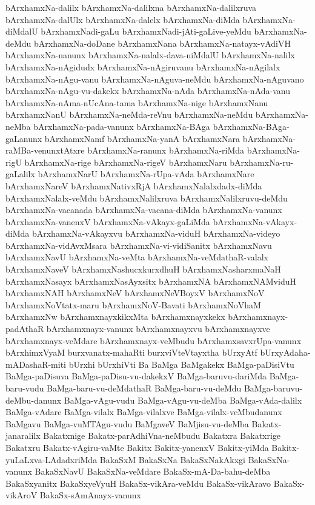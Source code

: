{bArxhamxNa-dalilx
bArxhamxNa-dalilxna
bArxhamxNa-dalilxruva
bArxhamxNa-dalUlx
bArxhamxNa-dalelx
bArxhamxNa-diMda
bArxhamxNa-diMdalU
bArxhamxNadi-gaLu
bArxhamxNadi-jAti-gaLive-yeMdu
bArxhamxNa-deMdu
bArxhamxNa-doDane
bArxhamxNana
bArxhamxNa-natayx-vAdiVH
bArxhamxNa-nanunx
bArxhamxNa-nalalx-dava-niMdalU
bArxhamxNa-nalilx
bArxhamxNa-nAgidudx
bArxhamxNa-nAgiruvanu
bArxhamxNa-nAgilalx
bArxhamxNa-nAgu-vanu
bArxhamxNa-nAguva-neMdu
bArxhamxNa-nAguvano
bArxhamxNa-nAgu-vu-dakekx
bArxhamxNa-nAda
bArxhamxNa-nAda-vanu
bArxhamxNa-nAma-nUcAna-tama
bArxhamxNa-nige
bArxhamxNanu
bArxhamxNanU
bArxhamxNa-neMda-reVnu
bArxhamxNa-neMdu
bArxhamxNa-neMba
bArxhamxNa-pada-vanunx
bArxhamxNa-BAga
bArxhamxNa-BAga-gaLanunx
bArxhamxNamf
bArxhamxNa-yanA
bArxhamxNara
bArxhamxNa-raMBa-venunxtAtxre
bArxhamxNa-ranunx
bArxhamxNa-riMda
bArxhamxNa-rigU
bArxhamxNa-rige
bArxhamxNa-rigeV
bArxhamxNaru
bArxhamxNa-ru-gaLalilx
bArxhamxNarU
bArxhamxNa-rUpa-vAda
bArxhamxNare
bArxhamxNareV
bArxhamxNativxRjA
bArxhamxNalalxdadx-diMda
bArxhamxNalalx-veMdu
bArxhamxNalilxruva
bArxhamxNalilxruvu-deMdu
bArxhamxNa-vacanada
bArxhamxNa-vacana-diMda
bArxhamxNa-vanunx
bArxhamxNa-vanenxV
bArxhamxNa-vAkayx-gaLiMda
bArxhamxNa-vAkayx-diMda
bArxhamxNa-vAkayxvu
bArxhamxNa-viduH
bArxhamxNa-videyo
bArxhamxNa-vidAvxMsara
bArxhamxNa-vi-vidiSanitx
bArxhamxNavu
bArxhamxNavU
bArxhamxNa-veMta
bArxhamxNa-veMdathaR-valalx
bArxhamxNaveV
bArxhamxNashucxkurxdhuH
bArxhamxNasharxmaNaH
bArxhamxNasayx
bArxhamxNasAyxsitx
bArxhamxNA
bArxhamxNAMviduH
bArxhamxNAH
bArxhamxNeV
bArxhamxNeVBoyxV
bArxhamxNoV
bArxhamxNoVtatx-maru
bArxhamxNoV-Bavati
bArxhamxNoVhaM
bArxhamxNw
bArxhamxnayxkikxMta
bArxhamxnayxkekx
bArxhamxnayx-padAthaR
bArxhamxnayx-vanunx
bArxhamxnayxvu
bArxhamxnayxve
bArxhamxnayx-veMdare
bArxhamxnayx-veMbudu
bArxhamxsavxrUpa-vanunx
bArxhimxVyaM
burxvanatx-mahaRti
burxviVteVtayxtha
bUrxyAtf
bUrxyAdaha-mADashaR-miti
bUrxhi
bUrxhiVti
Ba
BaMga
BaMgakekx
BaMga-paDisiVtu
BaMga-paDisuva
BaMga-paDisu-vu-dakekxV
BaMga-baruvu-dariMda
BaMga-baru-vudu
BaMga-baru-vu-deMdathaR
BaMga-baru-vu-deMdu
BaMga-baruvu-deMbu-danunx
BaMga-vAgu-vudu
BaMga-vAgu-vu-deMba
BaMga-vAda-dalilx
BaMga-vAdare
BaMga-vilalx
BaMga-vilalxve
BaMga-vilalx-veMbudanunx
BaMgavu
BaMga-vuMTAgu-vudu
BaMgaveV
BaMjisu-vu-deMba
Bakatx-janaralilx
Bakatxnige
Bakatx-parAdhiVna-neMbudu
Bakatxra
Bakatxrige
Bakatxru
Bakatx-vAgiru-vaMte
Bakitx
Bakitx-yanenxV
Bakitx-yiMda
Bakitx-yuLaLxva-LAdadxriMda
BakaSxM
BakaSxNa
BakaSxNakAkxgi
BakaSxNa-vanunx
BakaSxNavU
BakaSxNa-veMdare
BakaSx-mA-Da-bahu-deMba
BakaSxyanitx
BakaSxyeVyuH
BakaSx-vikAra-veMdu
BakaSx-vikAravo
BakaSx-vikAroV
BakaSx-sAmAnayx-vanunx
}
